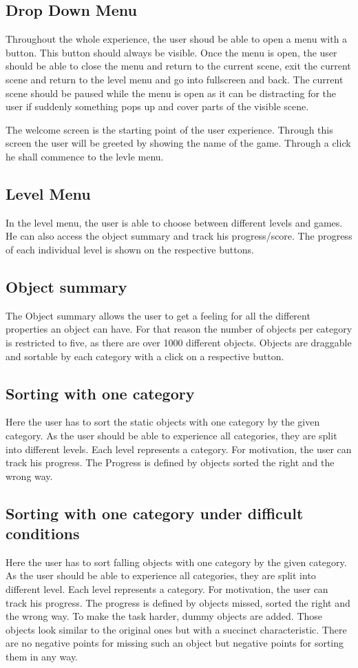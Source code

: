 \subsection{Drop Down Menu}
Throughout the whole experience, the user shoud be able to open a menu with a button.
This button should always be visible.
Once the menu is open, the user should be able to close the menu and return to the current scene,
exit the current scene and return to the level menu and go into fullscreen and back.
The current scene should be paused while the menu is open as it can be distracting for the user
if suddenly something pops up and cover parts of the visible scene.

The welcome screen is the starting point of the user experience.
Through this screen the user will be greeted by showing the name of the game.
Through a click he shall commence to the levle menu.

\subsection{Level Menu}
In the level menu, the user is able to choose between different levels and games.
He can also access the object summary and track his progress/score.
The progress of each individual level is shown on the respective buttons.

\subsection{Object summary}
The Object summary allows the user to get a feeling for all the different properties an object can have.
For that reason the number of objects per category is restricted to five, as there are over 1000 different objects.
Objects are draggable and sortable by each category with a click on a respective button.

\subsection{Sorting with one category}
Here the user has to sort the static objects with one category by the given category.
As the user should be able to experience all categories, they are split into different levels.
Each level represents a category.
For motivation, the user can track his progress.
The Progress is defined by objects sorted the right and the wrong way.

\subsection{Sorting with one category under difficult conditions}
Here the user has to sort falling objects with one category by the given category.
As the user should be able to experience all categories, they are split into different level.
Each level represents a category.
For motivation, the user can track his progress.
The progress is defined by objects missed, sorted the right and the wrong way.
To make the task harder, dummy objects are added.
Those objects look similar to the original ones but with a succinct characteristic.
There are no negative points for missing such an object but negative points for sorting them in any way.

